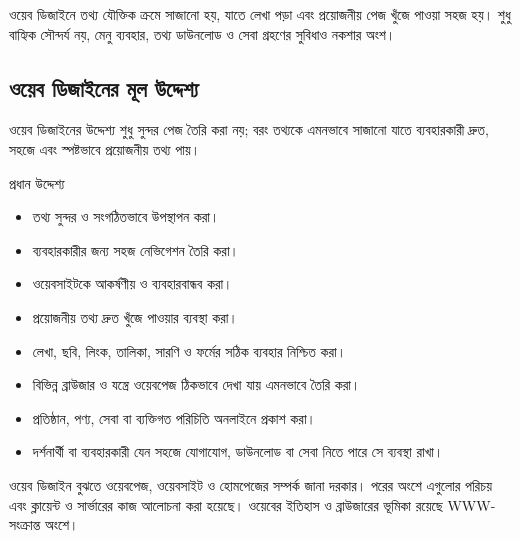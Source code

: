 ওয়েব ডিজাইনে তথ্য যৌক্তিক ক্রমে সাজানো হয়, যাতে লেখা পড়া এবং প্রয়োজনীয় পেজ খুঁজে পাওয়া সহজ হয়। শুধু বাহ্যিক সৌন্দর্য নয়, মেনু ব্যবহার, তথ্য ডাউনলোড ও সেবা গ্রহণের সুবিধাও নকশার অংশ।

\subsection{ওয়েব ডিজাইনের মূল উদ্দেশ্য}

ওয়েব ডিজাইনের উদ্দেশ্য শুধু সুন্দর পেজ তৈরি করা নয়; বরং তথ্যকে এমনভাবে সাজানো যাতে ব্যবহারকারী দ্রুত, সহজে এবং স্পষ্টভাবে প্রয়োজনীয় তথ্য পায়।

\begin{keypointbox}{প্রধান উদ্দেশ্য}
\par\noindent
\begin{minipage}[t]{.48\linewidth}\vspace{0pt}
\begin{itemize}
\item তথ্য সুন্দর ও সংগঠিতভাবে উপস্থাপন করা।
\item ব্যবহারকারীর জন্য সহজ নেভিগেশন তৈরি করা।
\item ওয়েবসাইটকে আকর্ষণীয় ও ব্যবহারবান্ধব করা।
\item প্রয়োজনীয় তথ্য দ্রুত খুঁজে পাওয়ার ব্যবস্থা করা।
\end{itemize}
\end{minipage}\hfill
\begin{minipage}[t]{.48\linewidth}\vspace{0pt}
\begin{itemize}
\item লেখা, ছবি, লিংক, তালিকা, সারণি ও ফর্মের সঠিক ব্যবহার নিশ্চিত করা।
\item বিভিন্ন ব্রাউজার ও যন্ত্রে ওয়েবপেজ ঠিকভাবে দেখা যায় এমনভাবে তৈরি করা।
\item প্রতিষ্ঠান, পণ্য, সেবা বা ব্যক্তিগত পরিচিতি অনলাইনে প্রকাশ করা।
\item দর্শনার্থী বা ব্যবহারকারী যেন সহজে যোগাযোগ, ডাউনলোড বা সেবা নিতে পারে সে ব্যবস্থা রাখা।
\end{itemize}
\end{minipage}\par

\end{keypointbox}

ওয়েব ডিজাইন বুঝতে ওয়েবপেজ, ওয়েবসাইট ও হোমপেজের সম্পর্ক জানা দরকার। পরের অংশে এগুলোর পরিচয় এবং ক্লায়েন্ট ও সার্ভারের কাজ আলোচনা করা হয়েছে। ওয়েবের ইতিহাস ও ব্রাউজারের ভূমিকা রয়েছে WWW-সংক্রান্ত অংশে।


